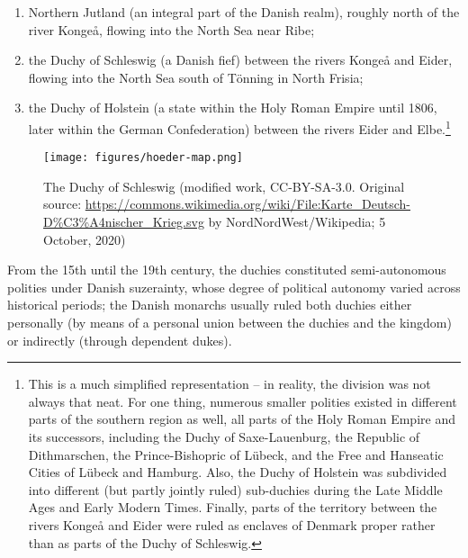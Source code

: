 \documentclass[output=paper]{langsci/langscibook}
\begin{document}
\begin{enumerate}\sloppy
\item Northern Jutland (an integral part of the Danish realm), roughly north of the river Kongeå, flowing into the North Sea near Ribe;
\item the Duchy of Schleswig (a Danish fief) between the rivers Kongeå and Eider, flowing into the North Sea south of Tönning in North Frisia;
\item the Duchy of Holstein (a state within the Holy Roman Empire until 1806, later within the German Confederation) between the rivers Eider and Elbe.\footnote{This is a much simplified representation – in reality, the division was not always that neat. For one thing, numerous smaller polities existed in different parts of the southern region as well, all parts of the Holy Roman Empire and its successors, including the Duchy of Saxe-Lauenburg, the Republic of Dithmarschen, the Prince-Bishopric of Lübeck, and the Free and Hanseatic Cities of Lübeck and Hamburg. Also, the Duchy of Holstein was subdivided into different (but partly jointly ruled) sub-duchies during the Late Middle Ages and Early Modern Times. Finally, parts of the territory between the rivers Kongeå and Eider were ruled as enclaves of Denmark proper rather than as parts of the Duchy of Schleswig.}
\end{enumerate}

\begin{figure}
\texttt{[image: figures/hoeder-map.png]}
\caption{The Duchy of Schleswig (modified work, CC-BY-SA-3.0. Original source: \url{https://commons.wikimedia.org/wiki/File:Karte_Deutsch-D\%C3\%A4nischer_Krieg.svg} by NordNordWest/Wikipedia; 5 October, 2020)}\label{fig:hoeder:1}
\end{figure}

From the 15th until the 19th century, the duchies constituted semi-autonomous polities under Danish suzerainty, whose degree of political autonomy varied across historical periods; the Danish monarchs usually ruled both duchies either personally (by means of a personal union between the duchies and the kingdom) or indirectly (through dependent dukes).
\end{document}
